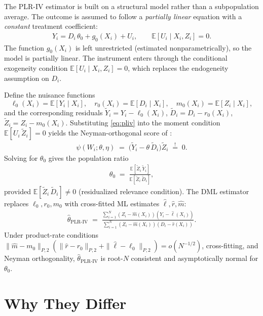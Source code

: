 \documentclass[12pt,a4paper]{article}
\newcommand{\E}{\mathbb{E}}
\newcommand{\tY}{\widetilde{Y}}
\newcommand{\tD}{\widetilde{D}}
\newcommand{\tZ}{\widetilde{Z}}
\begin{document}
The PLR-IV estimator is built on a structural model rather than a subpopulation average.
The outcome is assumed to follow a \emph{partially linear} equation with a
\emph{constant} treatment coefficient:
\begin{align}
  Y_i = D_i\,\theta_0 + g_0(X_i) + U_i,
  \qquad
  \E[U_i\mid X_i,Z_i]=0.
  \label{eq:pliv}
\end{align}
The function $g_0(X_i)$ is left unrestricted (estimated nonparametrically), so the model
is partially linear.  The instrument enters through the conditional exogeneity condition
$\E[U_i\mid X_i,Z_i]=0$, which replaces the endogeneity assumption on $D_i$.

Define the nuisance functions
\[
  \ell_0(X_i)=\E[Y_i\mid X_i],\quad
  r_0(X_i)=\E[D_i\mid X_i],\quad
  m_0(X_i)=\E[Z_i\mid X_i],
\]
and the corresponding residuals $\tY_i=Y_i-\ell_0(X_i)$,
$\tD_i=D_i-r_0(X_i)$, $\tZ_i=Z_i-m_0(X_i)$.
Substituting \eqref{eq:pliv} into the moment condition $\E[U_i\,\tZ_i]=0$ yields the
Neyman-orthogonal score of \citet{chernozhukov2018double}:
\begin{align}
  \psi(W_i;\theta,\eta)
  \;=\;
  \bigl(\tY_i - \theta\,\tD_i\bigr)\tZ_i
  \;\stackrel{!}{=}\; 0.
  \label{eq:pliv_score}
\end{align}
Solving for $\theta_0$ gives the population ratio
\begin{align}
  \theta_0
  \;=\;
  \frac{\E[\tZ_i\,\tY_i]}{\E[\tZ_i\,\tD_i]},
  \label{eq:pliv_ratio}
\end{align}
provided $\E[\tZ_i\,\tD_i]\neq 0$ (residualized relevance condition).  The DML
estimator replaces $\ell_0,r_0,m_0$ with cross-fitted ML estimates $\hat\ell,\hat
r,\hat m$:
\begin{align}
  \hat\theta_{\mathrm{PLR\text{-}IV}}
  \;=\;
  \frac{
    \sum_{i=1}^{N}(Z_i-\hat m(X_i))(Y_i-\hat\ell(X_i))
  }{
    \sum_{i=1}^{N}(Z_i-\hat m(X_i))(D_i-\hat r(X_i))
  }.
  \label{eq:pliv_dml}
\end{align}
Under product-rate conditions
$\|\hat m - m_0\|_{P,2}(\|\hat r-r_0\|_{P,2}+\|\hat\ell-\ell_0\|_{P,2})=o(N^{-1/2})$,
cross-fitting, and Neyman orthogonality, $\hat\theta_{\mathrm{PLR\text{-}IV}}$ is
root-$N$ consistent and asymptotically normal for $\theta_0$.

\section{Why They Differ}
\end{document}
